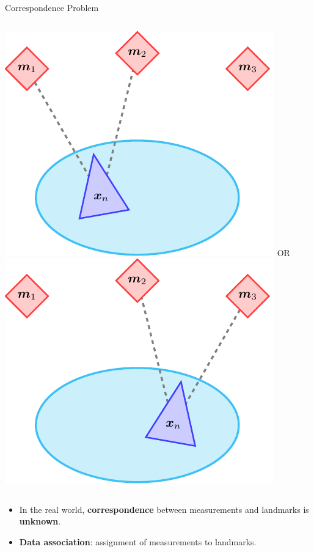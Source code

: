 \documentclass{beamer}
\begin{document}
\begin{frame}{Correspondence Problem}

\begin{columns}

\includegraphics[width=\textwidth]{tikz/correspondence1.pdf}
\centering
OR
\includegraphics[width=\textwidth]{tikz/correspondence2.pdf}
\end{columns}

\vspace{2em}
\begin{itemize}
\setlength\itemsep{1em}
\item In the real world, \textbf{correspondence} between measurements and landmarks is \textbf{unknown}.
\item \textbf{Data association}: assignment of measurements to landmarks.
\end{itemize}
\end{frame}
\end{document}
